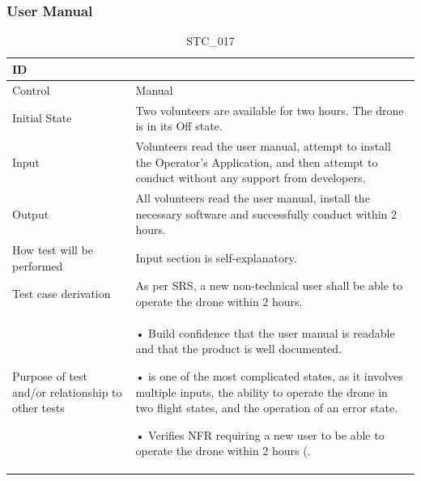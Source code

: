 \documentclass[12pt, titlepage]{article}
\begin{document}
\subsubsection{User Manual}
\begin{table}[!h]
\begin{center}
\caption {STC\_017}
\label{tab:STC_017}
\begin{tabular}{ | m{3.2cm} | m{12.2cm} | } 
\hline
ID & \nameref{tab:STC_017} \\ 
\hline
Control & Manual \\ 
\hline
Initial State & Two volunteers are available for two hours. The drone is in its Off state. \\ 
\hline
Input & Volunteers read the user manual, attempt to install the Operator's Application, and then attempt to conduct \nameref{tab:STC_009} without any support from developers. \\ 
\hline
Output &  All volunteers read the user manual, install the necessary software and successfully conduct \nameref{tab:STC_009} within 2 hours. 
 \\ 
\hline
How test will be performed & Input section is self-explanatory.\\ 
\hline
Test case derivation & As per SRS, a new non-technical user shall be able to operate the drone within 2 hours.
 \\ 
\hline
Purpose of test and/or relationship to other tests &  • Build confidence that the user manual is readable and that the product is well documented.

• \nameref{tab:STC_009} is one of the most complicated states, as it involves multiple inputs, the ability to operate the drone in two flight states, and the operation of an error state. 

• Verifies NFR requiring a new user to be able to operate the drone within 2 hours (\nameref{USE_004}. 
\\ 
\hline
\end{tabular}
\end{center}
\end{table}
\end{document}
